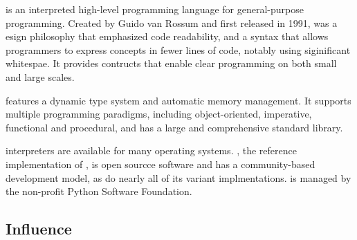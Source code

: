 \documentclass[../Languages.tex]{subfiles}
\begin{document}
\label{sec:python_3}

 is an interpreted high-level programming language for
general-purpose programming. Created by Guido van Rossum and first released in
1991,  was a esign philosophy that emphasized code readability, and
a syntax that allows programmers to express concepts in fewer lines of code,
notably using siginificant whitespae. It provides contructs that enable clear
programming on both small and large scales.

 features a dynamic type system and automatic memory management. It
supports multiple programming paradigms, including object-oriented, imperative,
functional and procedural, and has a large and comprehensive standard library.

 interpreters are available for many operating systems.
, the reference implementation of , is open sourcce
software and has a community-based development model, as do nearly all of its
variant implmentations.  is managed by the non-profit Python
Software Foundation.

\subsection{Influence}\label{sub:influence}
\end{document}
